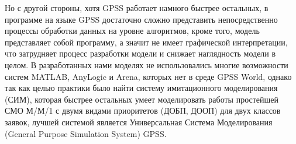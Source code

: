 \documentclass[a4paper,14pt]{report} %
\begin{document}
Но с другой стороны, хотя GPSS работает намного быстрее остальных, в программе на языке GPSS достаточно сложно представить непосредственно процессы обработки данных на уровне алгоритмов, кроме того, модель представляет собой программу, а значит не имеет графической интерпретации, что затрудняет процесс разработки модели и снижает наглядность модели в целом. В разработанных нами моделях не использовались многие возможности систем MATLAB, AnyLogic и Arena, которых нет в среде GPSS World, однако так как целью практики было найти систему имитационного моделирования (СИМ), которая быстрее остальных умеет моделировать работы простейшей СМО М/М/1 с двумя видами приоритетов (ДОБП, ДООП) для двух классов заявок, лучшей системой является Универсальная Система Моделирования (General Purpose Simulation System) GPSS.
\end{document}
